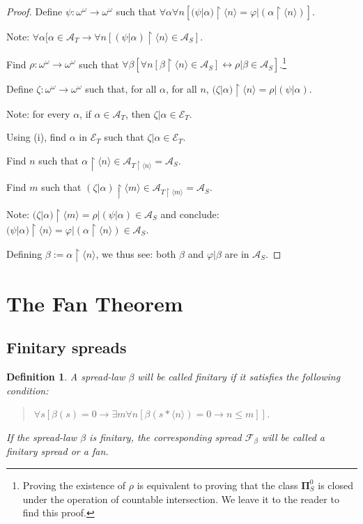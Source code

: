 \documentclass[a4paper]{amsart}
\theoremstyle{plain}
\newtheorem{definition}{Definition}
\begin{document}
\begin{proof}
 Define $\psi:\omega^\omega\rightarrow \omega^\omega$ such that $\forall \alpha\forall n[(\psi|\alpha)\upharpoonright \langle n \rangle = \varphi|(\alpha\upharpoonright\langle n  \rangle )]$.
 
 Note: $\forall \alpha[\alpha\in\mathcal{A}_T\rightarrow \forall n[(\psi|\alpha)\upharpoonright\langle n \rangle\in\mathcal{A}_S]$. 
 
 Find $\rho:\omega^\omega\rightarrow\omega^\omega$ such that $\forall \beta[\forall n[\beta\upharpoonright\langle n \rangle \in \mathcal{A}_S] \leftrightarrow \rho|\beta \in \mathcal{A}_S]$.\footnote{Proving the existence of $\rho$ is equivalent to proving that the class $\mathbf{\Pi}^0_S$ is closed under the operation of countable intersection.  We leave it to the reader to find this proof.}
 
 Define $\zeta:\omega^\omega\rightarrow \omega^\omega$ such that, for all $\alpha$, for all $n$, $(\zeta|\alpha)\upharpoonright\langle n \rangle = \rho |(\psi|\alpha)$. 
 
 Note: for every $\alpha$, if $\alpha \in \mathcal{A}_T$, then $\zeta|\alpha \in \mathcal{E}_T$. 
 
 Using (i), find $\alpha$ in $\mathcal{E}_T$ such that $\zeta|\alpha \in \mathcal{E}_T$. 
 
 Find $n$ such that $\alpha\upharpoonright \langle n \rangle \in \mathcal{A}_{T\upharpoonright \langle n \rangle}=\mathcal{A}_S$.
 
 Find $m$ such that $(\zeta|\alpha)\upharpoonright\langle m \rangle \in \mathcal{A}_{T\upharpoonright\langle m \rangle}=\mathcal{A}_S$.
 
 Note: $(\zeta|\alpha)\upharpoonright \langle m \rangle = \rho|(\psi|\alpha) \in \mathcal{A}_S$ and conclude: \\$(\psi|\alpha)\upharpoonright\langle n \rangle =\varphi|(\alpha\upharpoonright\langle n \rangle) \in \mathcal{A}_S$.
 
 Defining $\beta:=\alpha\upharpoonright \langle n \rangle$, we thus see: both $\beta$ and $\varphi|\beta$ are in $\mathcal{A}_S$. 
 \end{proof}


 \section{The Fan Theorem}\label{S:ft}
 
 \subsection{Finitary spreads}\begin{definition}
 A spread-law $\beta$ will be called \emph{finitary} if it satisfies the following condition: \begin{quote} $\forall s[\beta(s)=0\rightarrow \exists m\forall n[\beta(s\ast\langle n \rangle)=0\rightarrow n\le m]]$. \end{quote}
 
If the spread-law $\beta$ is finitary, the corresponding spread $\mathcal{F}_\beta$ will be called a \emph{finitary spread} or a \emph{fan}. \end{definition}
\end{document}

